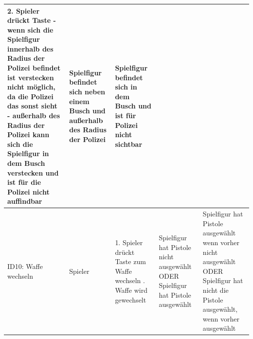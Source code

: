 \begin{longtable}{|p{1.6cm}|p{1.9cm}|p{5.5cm}|p{3.2cm}|p{4.2cm}|}
    2. Spieler drückt Taste\newline
    - wenn sich die Spielfigur innerhalb des Radius der Polizei befindet ist verstecken nicht möglich, da die Polizei das sonst sieht
    - außerhalb des Radius der Polizei kann sich die Spielfigur in dem Busch verstecken und ist für die Polizei nicht auffindbar &
    Spielfigur befindet sich neben einem Busch und außerhalb des Radius der Polizei &
    Spielfigur befindet sich in dem Busch und ist für Polizei nicht sichtbar \\
    \hline
    ID10: Waffe wechseln & Spieler &
    1. Spieler drückt Taste zum Waffe wechseln \newline
    2. Waffe wird gewechselt &
    Spielfigur hat Pistole nicht ausgewählt\newline
    ODER\newline
    Spielfigur hat Pistole ausgewählt &

    Spielfigur hat Pistole ausgewählt wenn vorher nicht ausgewählt \newline
    ODER\newline
    Spielfigur hat nicht die Pistole ausgewählt, wenn vorher ausgewählt  \\
    \hline
\end{longtable}

\let\clearpage\origclearpage
\restoregeometry


